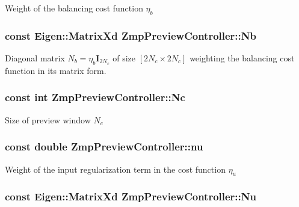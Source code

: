 \-Weight of the balancing cost function $ \eta_b $ \hypertarget{classZmpPreviewController_abd345d397e99ae01ad4ea80cd9894802}{
\subsubsection[{\-Nb}]{\setlength{\rightskip}{0pt plus 5cm}const \-Eigen\-::\-Matrix\-Xd {\bf \-Zmp\-Preview\-Controller\-::\-Nb}}}\label{classZmpPreviewController_abd345d397e99ae01ad4ea80cd9894802}
\-Diagonal matrix $N_b = \eta_b\mathbf{I}_{2N_c}$ of size $[2N_c \times 2N_c]$ weighting the balancing cost function in its matrix form. \hypertarget{classZmpPreviewController_af0c8b4aa92a6e3e95f80d81a8c91f693}{
\subsubsection[{\-Nc}]{\setlength{\rightskip}{0pt plus 5cm}const int {\bf \-Zmp\-Preview\-Controller\-::\-Nc}}}\label{classZmpPreviewController_af0c8b4aa92a6e3e95f80d81a8c91f693}
\-Size of preview window $ N_c $ \hypertarget{classZmpPreviewController_ac611f084023404faba1ccfab573cd81d}{
\subsubsection[{nu}]{\setlength{\rightskip}{0pt plus 5cm}const double {\bf \-Zmp\-Preview\-Controller\-::nu}}}\label{classZmpPreviewController_ac611f084023404faba1ccfab573cd81d}
\-Weight of the input regularization term in the cost function $\eta_u$ \hypertarget{classZmpPreviewController_ac3e92145988993ede7ce2060b997c8db}{
\subsubsection[{\-Nu}]{\setlength{\rightskip}{0pt plus 5cm}const \-Eigen\-::\-Matrix\-Xd {\bf \-Zmp\-Preview\-Controller\-::\-Nu}}}\label{classZmpPreviewController_ac3e92145988993ede7ce2060b997c8db}
